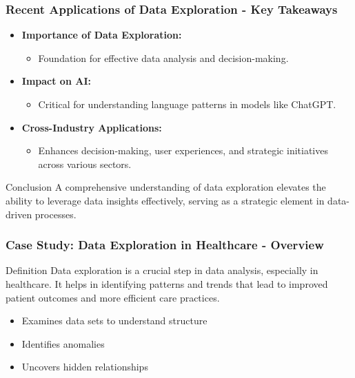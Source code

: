 \documentclass[aspectratio=169]{beamer}
\begin{document}
\begin{frame}[fragile]
    \frametitle{Recent Applications of Data Exploration - Key Takeaways}
    \begin{itemize}
        \item \textbf{Importance of Data Exploration:}
            \begin{itemize}
                \item Foundation for effective data analysis and decision-making.
            \end{itemize}
        \item \textbf{Impact on AI:}
            \begin{itemize}
                \item Critical for understanding language patterns in models like ChatGPT.
            \end{itemize}
        \item \textbf{Cross-Industry Applications:}
            \begin{itemize}
                \item Enhances decision-making, user experiences, and strategic initiatives across various sectors.
            \end{itemize}
    \end{itemize}
    \begin{block}{Conclusion}
        A comprehensive understanding of data exploration elevates the ability to leverage data insights effectively, serving as a strategic element in data-driven processes.
    \end{block}
\end{frame}

\begin{frame}[fragile]
    \frametitle{Case Study: Data Exploration in Healthcare - Overview}
    \begin{block}{Definition}
        Data exploration is a crucial step in data analysis, especially in healthcare. It helps in identifying patterns and trends that lead to improved patient outcomes and more efficient care practices.
    \end{block}
    \begin{itemize}
        \item Examines data sets to understand structure
        \item Identifies anomalies
        \item Uncovers hidden relationships
    \end{itemize}
\end{frame}
\end{document}
